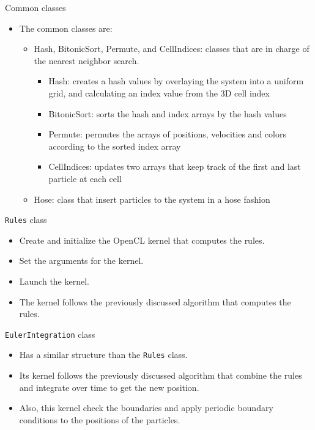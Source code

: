 \documentclass[red]{beamer}
\begin{document}
\begin{frame}{Common classes}
	\begin{itemize}
		\pause \item The common classes are:
			\begin{itemize}
				\pause \item Hash, BitonicSort, Permute, and CellIndices: classes that are in charge of the nearest neighbor search.
					\begin{itemize}
						\pause \item Hash: creates a hash values by overlaying the system into a uniform grid, and calculating an index value from the 3D cell index
						\pause \item BitonicSort: sorts the hash and index arrays by the hash values
						\pause \item Permute: permutes the arrays of positions, velocities and colors according to the sorted index array
						\pause \item CellIndices: updates two arrays that keep track of the first and last particle at each cell
					\end{itemize}
				\pause \item Hose: class that insert particles to the system in a hose fashion
			\end{itemize}
	\end{itemize}
\end{frame}

\begin{frame}{\texttt{Rules} class}
	\begin{itemize}
		\pause \item Create and initialize the OpenCL kernel that computes the rules.
		\pause \item Set the arguments for the kernel.
		\pause \item Launch the kernel.
		\pause \item The kernel follows the previously discussed algorithm that computes the rules.
	\end{itemize}
\end{frame}

\begin{frame}{\texttt{EulerIntegration} class}
	\begin{itemize}
		\pause \item Has a similar structure than the \texttt{Rules} class.
		\pause \item Its kernel follows the previously discussed algorithm that combine the rules and integrate over time to get the new position.
		\pause \item Also, this kernel check the boundaries and apply periodic boundary conditions to the positions of the particles.
	\end{itemize}
\end{frame}
\end{document}
